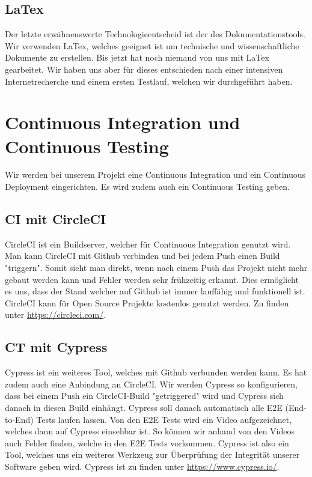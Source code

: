 	\subsection{LaTex}
	Der letzte erwähnenswerte Technologieentscheid ist der des Dokumentationstools. Wir verwenden LaTex, welches geeignet ist um technische und wissenschaftliche Dokumente zu erstellen. Bis jetzt hat noch niemand von uns mit LaTex gearbeitet. Wir haben uns aber für dieses entschieden nach einer intensiven Internetrecherche und einem ersten Testlauf, welchen wir durchgeführt haben.

	\section{Continuous Integration und Continuous Testing}
	Wir werden bei unserem Projekt eine Continuous Integration und ein Continuous Deployment eingerichten. Es wird zudem auch ein Continuous Testing geben.

	\subsection{CI mit CircleCI}
	CircleCI ist ein Buildserver, welcher für Continuous Integration genutzt wird. Man kann CircleCI mit Github verbinden und bei jedem Push einen Build "triggern". Somit sieht man direkt, wenn nach einem Push das Projekt nicht mehr gebaut werden kann und Fehler werden sehr frühzeitig erkannt. Dies ermöglicht es uns, dass der Stand welcher auf Github ist immer lauffähig und funktionell ist. CircleCI kann für Open Source Projekte kostenlos genutzt werden. Zu finden unter \href{https://circleci.com/}{https://circleci.com/}.

	\subsection{CT mit Cypress}
	Cypress ist ein weiteres Tool, welches mit Github verbunden werden kann. Es hat zudem auch eine Anbindung an CircleCI. Wir werden Cypress so konfigurieren, dass bei einem Push ein CircleCI-Build "getriggered" wird und Cypress sich danach in diesen Build einhängt. Cypress soll danach automatisch alle E2E (End-to-End) Tests laufen lassen. Von den E2E Tests wird ein Video aufgezeichnet, welches dann auf Cypress einsehbar ist. So können wir anhand von den Videos auch Fehler finden, welche in den E2E Tests vorkommen. Cypress ist also ein Tool, welches uns ein weiteres Werkzeug zur Überprüfung der Integrität unserer Software geben wird. Cypress ist zu finden unter \href{https://www.cypress.io/}{https://www.cypress.io/}.

